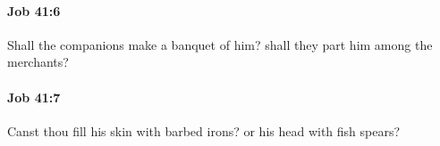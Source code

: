 		\paragraph{Job 41:6} %
			\label{JOB-41-6}

			Shall the companions make a banquet of him? shall they part him among the merchants?


		\paragraph{Job 41:7} %
			\label{JOB-41-7}

			Canst thou fill his skin with barbed irons? or his head with fish spears?


